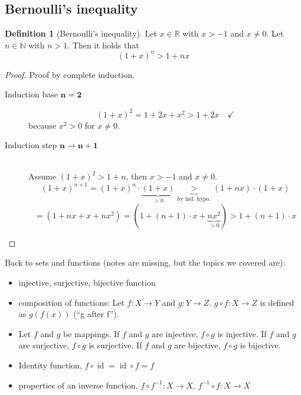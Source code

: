 \documentclass[a4paper,landscape,twocolumn]{article}
\theoremstyle{definition}
\newtheorem{defi}{Definition}
\begin{document}
\subsection{Bernoulli's inequality}
%
\begin{defi}[Bernoulli's inequality]
  Let $x \in \mathbb R$ with $x > -1$ and $x \neq 0$.
  Let $n \in \mathbb N$ with $n > 1$. Then it holds that
  \[ (1 + x)^n > 1 + nx \]
\end{defi}
\begin{proof}
  Proof by complete induction.
  \begin{description}
    \item[Induction base $\mathbf{n = 2}$]
      \[ (1 + x)^2 = 1 + 2x + x^2 > 1 + 2x \quad\checkmark \]
      because $x^2 > 0$ for $x \neq 0$.
    \item[Induction step $\mathbf{n \to n+1}$] \hfill{} \\
      Assume $(1+x)^2 > 1 + n$, then $x > -1$ and $x \neq 0$.
      \[ (1 + x)^{n+1} = (1 + x)^n \cdot \underbrace{(1 + x)}_{>0} \underbrace{>}_{\text{by ind. hypo.}} (1+nx) \cdot (1 + x) \]
      \[ = (1 + nx + x + nx^2) = (1 + (n+1)\cdot x + \underbrace{nx^2}_{>0}) > 1 + (n + 1) \cdot x \]
  \end{description}
\end{proof}

Back to sets and functions (notes are missing, but the topics we covered are):
\begin{itemize}
  \item injective, surjective, bijective function
  \item composition of functions: Let $f: X \to Y$ and $g: Y \to Z$. $g \circ f: X \to Z$ is defined as $g(f(x))$ (\enquote{g after f}).
  \item Let $f$ and $g$ be mappings. If $f$ and $g$ are injective, $f \circ g$ is injective. If $f$ and $g$ are surjective, $f \circ g$ is surjective. If $f$ and $g$ are bijective, $f \circ g$ is bijective.
  \item Identity function, $f \circ \operatorname{id} = \operatorname{id} \circ f = f$
  \item properties of an inverse function, $f \circ f^{-1}: X \to X$, $f^{-1} \circ f: X \to X$
\end{itemize}
\end{document}
